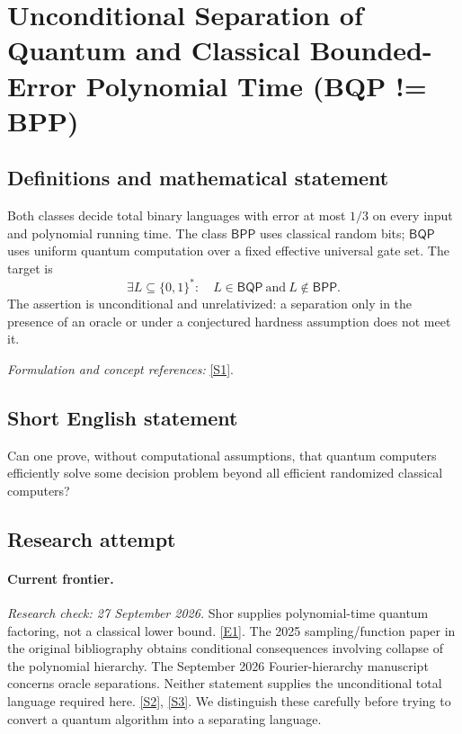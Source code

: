 \documentclass[11pt,a4paper]{article}
\newcommand{\sref}[2]{\hyperlink{source:#1:#2}{[S#2]}}
\newcommand{\eref}[2]{\hyperlink{extra:#1:#2}{[E#2]}}
\newif\ifshowcatalogue
\newcommand{\cataloguescope}[1]{\ifshowcatalogue
 \paragraph{Exact scope in the supplied catalogue.}
 \begin{quote}\small #1\end{quote}\fi}
\begin{document}
\setcounter{section}{0}
\clearpage
\section*{\texorpdfstring{Unconditional Separation of Quantum and Classical Bounded-Error Polynomial Time (BQP != BPP)}{Unconditional Separation of Quantum and Classical Bounded-Error Polynomial Time (BQP != BPP)}}\label{statement}
\subsection{Definitions and mathematical statement}
Both classes decide total binary languages with error at most $1/3$ on every input and polynomial running time. The class $\mathsf{BPP}$ uses classical random bits; $\mathsf{BQP}$ uses uniform quantum computation over a fixed effective universal gate set. The target is
\[
 \exists L\subseteq\{0,1\}^*:\quad L\in\mathsf{BQP}\ \text{and}\ L\notin\mathsf{BPP}.
\]
The assertion is unconditional and unrelativized: a separation only in the presence of an oracle or under a conjectured hardness assumption does not meet it.
\par\smallskip\textit{Formulation and concept references:} \sref{statement}{1}.
\cataloguescope{Prove unconditionally that bounded-error quantum polynomial time (BQP) strictly contains bounded-error probabilistic polynomial time (BPP).}
\subsection{Short English statement}
Can one prove, without computational assumptions, that quantum computers efficiently solve some decision problem beyond all efficient randomized classical computers?
\subsection{Research attempt}
\paragraph{Current frontier.}
\textit{Research check: 27 September 2026.}
Shor supplies polynomial-time quantum factoring, not a classical lower bound.
\eref{statement}{1}. The 2025 sampling/function paper in the original bibliography
obtains conditional consequences involving collapse of the polynomial
hierarchy. The September 2026 Fourier-hierarchy manuscript concerns oracle
separations. Neither statement supplies the unconditional total language
required here. \sref{statement}{2}, \sref{statement}{3}. We distinguish these carefully
before trying to convert a quantum algorithm into a separating language.
\end{document}
